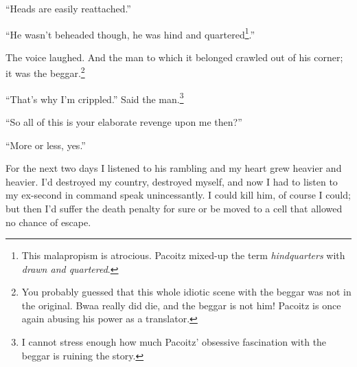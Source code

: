 ``Heads are easily reattached.''

``He wasn't beheaded though, he was hind and quartered\footnote{This malapropism is atrocious. Pacoitz mixed-up the term \emph{hindquarters} with \emph{drawn and quartered}.}.''

The voice laughed. And the man to which it belonged crawled out of his corner; it was the beggar.\footnote{You probably guessed that this whole idiotic scene with the beggar was not in the original. Bwaa really did die, and the beggar is not him! Pacoitz is once again abusing his power as a translator.}

``That's why I'm crippled.'' Said the man.\footnote{I cannot stress enough how much Pacoitz' obsessive fascination with the beggar is ruining the story.}

``So all of this is your elaborate revenge upon me then?''

``More or less, yes.''

For the next two days I listened to his rambling and my heart grew heavier and heavier. I'd destroyed my country, destroyed myself, and now I had to listen to my ex-second in command speak unincessantly. I could kill him, of course I could; but then I'd suffer the death penalty for sure or be moved to a cell that allowed no chance of escape.
